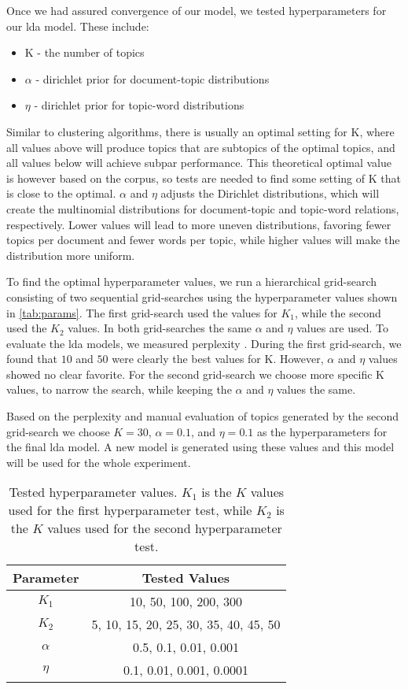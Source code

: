 Once we had assured convergence of our model, we tested hyperparameters for our \gls{lda} model.
These include:
\begin{itemize}
	\item K - the number of topics
	\item $\alpha$ - dirichlet prior for document-topic distributions
	\item $\eta$ - dirichlet prior for topic-word distributions
\end{itemize}
Similar to clustering algorithms, there is usually an optimal setting for K, where all values above will produce topics that are subtopics of the optimal topics, and all values below will achieve subpar performance.
This theoretical optimal value is however based on the corpus, so tests are needed to find some setting of K that is close to the optimal.
$\alpha$ and $\eta$ adjusts the Dirichlet distributions, which will create the multinomial distributions for document-topic and topic-word relations, respectively.
Lower values will lead to more uneven distributions, favoring fewer topics per document and fewer words per topic, while higher values will make the distribution more uniform.

To find the optimal hyperparameter values, we run a hierarchical grid-search consisting of two sequential grid-searches using the hyperparameter values shown in \autoref{tab:params}.
The first grid-search used the values for $K_1$, while the second used the $K_2$ values.
In both grid-searches the same $\alpha$ and $\eta$ values are used.
To evaluate the \gls{lda} models, we measured perplexity .
During the first grid-search, we found that $10$ and $50$ were clearly the best values for K.
However, $\alpha$ and $\eta$ values showed no clear favorite.
For the second grid-search we choose more specific K values, to narrow the search, while keeping the $\alpha$ and $\eta$ values the same.

Based on the perplexity and manual evaluation of topics generated by the second grid-search we choose $K = 30$, $\alpha = 0.1$, and $\eta = 0.1$ as the hyperparameters for the final \gls{lda} model.
A new model is generated using these values and this model will be used for the whole experiment.

\begin{table}[h]
	\centering
	\begin{tabular}{c|c}
		Parameter & Tested Values\\
		\hline
		$K_1$ & 10, 50, 100, 200, 300\\
		$K_2$ & 5, 10, 15, 20, 25, 30, 35, 40, 45, 50\\
		$\alpha$ & 0.5, 0.1, 0.01, 0.001\\
		$\eta$ & 0.1, 0.01, 0.001, 0.0001\\
	\end{tabular}
	\caption{Tested hyperparameter values. $K_1$ is the $K$ values used for the first hyperparameter test, while $K_2$ is the $K$ values used for the second hyperparameter test.}
	\label{tab:params}
\end{table}



